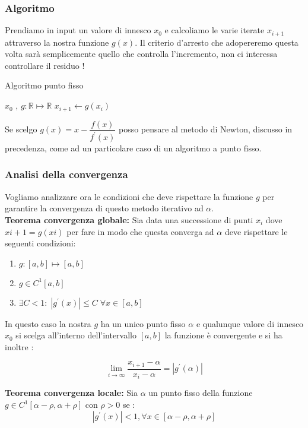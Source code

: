 \documentclass[12pt, a4paper]{book}
\theoremstyle{definition}
\begin{document}
\begin{flushleft}
\subsubsection{Algoritmo}
Prendiamo in input un valore di innesco $x_{0}$ e calcoliamo le varie iterate $x_{i+1}$ attraverso la nostra funzione $g(x)$.  Il criterio d'arresto che adopereremo questa volta sarà semplicemente quello che controlla l'incremento, non ci interessa controllare il residuo !
\begin{algorithm}
\caption{Algoritmo punto fisso}
	\begin{algorithmic} 
		\REQUIRE $x_{0}$ , $g : \mathbb{R} \mapsto \mathbb{R}$
			\STATE $ x_{i+1} \leftarrow  g(x_{i})$
		\ENDWHILE
	\end{algorithmic}
\end{algorithm}

Se scelgo $g(x) = x - \dfrac{f(x)}{f^{'}(x)}$ posso pensare al metodo di Newton, discusso in precedenza, come ad un particolare caso di un algoritmo a punto fisso.

\subsubsection{Analisi della convergenza}
Vogliamo analizzare ora le condizioni che deve rispettare la funzione $g$ per garantire la  convergenza di questo metodo iterativo ad $\alpha$.\\
\vspace{1em}
\textbf{Teorema convergenza globale:} Sia data una successione di punti $x_{i}$ dove $x{i+1} = g(x{i})$ per fare in modo che questa converga ad $\alpha$ deve rispettare le seguenti condizioni:
\begin{enumerate}
	\item $g: [a,b] \mapsto [a,b]$
	\item $g \in C^{1}[a,b]$
	\item $\exists C < 1: \; |g^{'}(x)| \leq C \; \forall x \in [a,b]$
\end{enumerate}

In questo caso la nostra $g$ ha un unico punto fisso $\alpha$ e qualunque valore di innesco $x_{0}$ si scelga all'interno dell'intervallo $[a,b]$ la funzione è convergente e si ha inoltre : 

\[ 
	\lim_{i \rightarrow \infty} \dfrac{x_{i+1} - \alpha}{x_{i} - \alpha} = |g^{'}(\alpha)| 
\]

\textbf{Teorema convergenza locale:} Sia $\alpha$ un punto fisso della funzione $g \in C^{1} [\alpha - \rho,\alpha + \rho]$ con 
$\rho > 0$ se :
\[
	|g^{'}(x)| < 1,  \forall x \in [\alpha - \rho,\alpha + \rho]
\]


\end{flushleft}
\end{document}
